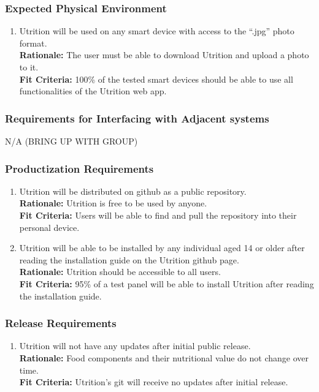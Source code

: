\documentclass[12pt]{article}
\begin{document}
\subsubsection{Expected Physical Environment}
\begin{enumerate}[{OE}1. ] 
	\item Utrition will be used on any smart device with access to the “.jpg” photo format.\\
	\textbf{Rationale:} The user must be able to download Utrition and upload a photo to it. \\
	\textbf{Fit Criteria:} 100\% of the tested smart devices should be able to use all functionalities of the Utrition web app.
\end{enumerate}

\subsubsection{Requirements for Interfacing with Adjacent systems}
\hspace{1.5cm}N/A (BRING UP WITH GROUP) 

\subsubsection{Productization Requirements}
\begin{enumerate}[start=2,label={OE\arabic*.}]
	\item Utrition will be distributed on github as a public repository.\\
	\textbf{Rationale:} Utrition is free to be used by anyone.\\
	\textbf{Fit Criteria:} Users will be able to find and pull the repository into their personal device.
	\item Utrition will be able to be installed by any individual aged 14 or older after reading the installation guide on the Utrition github page.\\
	\textbf{Rationale:} Utrition should be accessible to all users. \\
	\textbf{Fit Criteria:} 95\% of a test panel will be able to install Utrition after reading the installation guide.
\end{enumerate}

\subsubsection{Release Requirements}

\begin{enumerate}[{OE}4. ] 
	\item Utrition will not have any updates after initial public release.\\
	\textbf{Rationale:} Food components and their nutritional value do not change over time.\\	\textbf{Fit Criteria:} Utrition’s git will receive no updates after initial release.
\end{enumerate}
\end{document}
